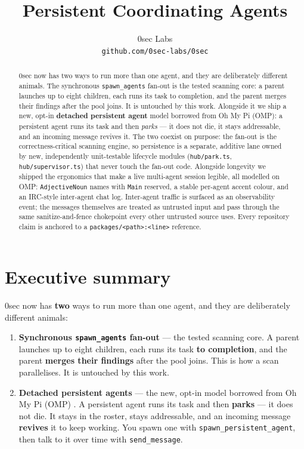 \documentclass[11pt]{article}
\title{Persistent Coordinating Agents}
\author{
  0sec Labs \\
  \texttt{github.com/0sec-labs/0sec}
}
\date{}
\begin{document}
\maketitle

\begin{abstract}
0sec now has two ways to run more than one agent, and they are deliberately
different animals. The synchronous \texttt{spawn\_agents} fan-out is the tested
scanning core: a parent launches up to eight children, each runs its task to
completion, and the parent merges their findings after the pool joins. It is
untouched by this work. Alongside it we ship a new, opt-in \textbf{detached
persistent agent} model borrowed from Oh My Pi (OMP): a persistent agent runs its
task and then \textit{parks} --- it does not die, it stays addressable, and an
incoming message revives it. The two coexist on purpose: the fan-out is the
correctness-critical scanning engine, so persistence is a separate, additive lane
owned by new, independently unit-testable lifecycle modules
(\texttt{hub/park.ts}, \texttt{hub/supervisor.ts}) that never touch the fan-out
code. Alongside longevity we shipped the ergonomics that make a live multi-agent
session legible, all modelled on OMP: \texttt{AdjectiveNoun} names with
\texttt{Main} reserved, a stable per-agent accent colour, and an IRC-style
inter-agent chat log. Inter-agent traffic is surfaced as an observability event;
the messages themselves are treated as untrusted input and pass through the same
sanitize-and-fence chokepoint every other untrusted source uses. Every repository
claim is anchored to a \texttt{packages/<path>:<line>} reference.
\end{abstract}

\section{Executive summary}

0sec now has \textbf{two} ways to run more than one agent, and they are
deliberately different animals:

\begin{enumerate}[leftmargin=*]
  \item \textbf{Synchronous \texttt{spawn\_agents} fan-out} --- the tested
  scanning core. A parent launches up to eight children, each runs its task
  \textbf{to completion}, and the parent \textbf{merges their findings} after the
  pool joins. This is how a scan parallelises. It is untouched by this work.
  \item \textbf{Detached persistent agents} --- the new, opt-in model borrowed
  from Oh My Pi (OMP) \citep{omp}. A persistent agent runs its task and then
  \textbf{parks} --- it does not die. It stays in the roster, stays addressable,
  and an incoming message \textbf{revives} it to keep working. You spawn one with
  \texttt{spawn\_persistent\_agent}, then talk to it over time with
  \texttt{send\_message}.
\end{enumerate}
\end{document}
